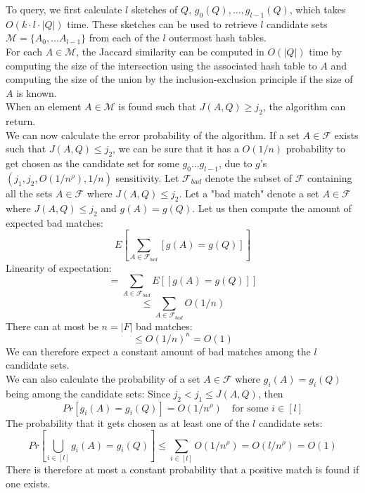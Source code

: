 To query, we first calculate $l$ sketches of $Q$, $g_0(Q), \dots, g_{l-1}(Q)$, which takes $O(k \cdot l \cdot |Q|)$ time. These sketches can be used to retrieve $l$ candidate sets $\mathcal{M} = \{ A_0, \dots A_{l-1}\}$ from each of the $l$ outermost hash tables. \\
For each $A\in \mathcal{M}$, the Jaccard similarity can be computed in $O(|Q|)$ time by computing the size of the intersection using the associated hash table to $A$ and computing the size of the union by the inclusion-exclusion principle if the size of $A$ is known.\\
When an element $A\in \mathcal{M}$ is found such that $J(A,Q) \geq j_2$, the algorithm can return.\\
We can now calculate the error probability of the algorithm. If a set $A \in \mathcal{F}$ exists such that $J(A,Q) \leq j_2$, we can be sure that it has a $O(1/n)$ probability to get chosen as the candidate set for some $g_0 \dots g_{l-1}$, due to $g$'s $(j_1, j_2, O(1/n^\rho), 1/n)$ sensitivity. Let $\mathcal{F}_{bad}$ denote the subset of $\mathcal{F}$ containing all the sets $A\in \mathcal{F}$ where $J(A,Q) \leq j_2$. Let a "bad match" denote a set $A\in \mathcal{F}$ where $J(A,Q) \leq j_2$ and $g(A) = g(Q)$. 
Let us then compute the amount of expected bad matches:
$$E[\sum_{A\in \mathcal{F}_{bad}}[g(A) = g(Q)]]$$
Linearity of expectation:
$$=\sum_{A\in \mathcal{F}_{bad}}E[[g(A) = g(Q)]]$$
$$\leq\sum_{A\in \mathcal{F}_{bad}}O(1/n)$$
There can at most be $n=|F|$ bad matches:
$$\leq O(1/n)^n = O(1)$$
We can therefore expect a constant amount of bad matches among the $l$ candidate sets.\\
We can also calculate the probability of a set $A\in \mathcal{F}$ where $g_i(A) = g_i(Q)$ being among the candidate sets:
Since $j_2 < j_1 \leq J(A,Q)$, then 
$$Pr[g_i(A) = g_i(Q)] = O(1/n^\rho)\quad \textrm{for some }i\in [l]$$
The probability that it gets chosen as at least one of the $l$ candidate sets:
$$Pr[\bigcup_{i\in [l]} g_i(A) = g_i(Q)] \leq \sum_{i\in [l]} O(1/n^\rho) = O(l/n^\rho) = O(1)$$
There is therefore at most a constant probability that a positive match is found if one exists.
